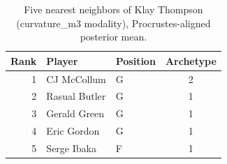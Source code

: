 \begin{table}[htbp]
  \centering\small
  \begin{tabular}{rllc}
    \toprule
    Rank & Player & Position & Archetype \\
    \midrule
    1 & CJ McCollum & G & 2 \\
    2 & Rasual Butler & G & 1 \\
    3 & Gerald Green & G & 1 \\
    4 & Eric Gordon & G & 1 \\
    5 & Serge Ibaka & F & 1 \\
    \bottomrule
  \end{tabular}
  \caption{Five nearest neighbors of Klay Thompson (curvature_m3 modality), Procrustes-aligned posterior mean.}
  \label{tab:Klay_Thompson_neighbors_curvature_m3}
\end{table}

